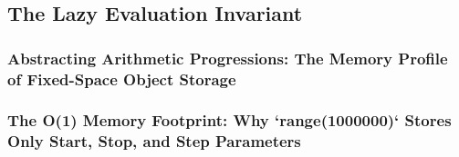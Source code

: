\subsection{The Lazy Evaluation Invariant}
\subsubsection{Abstracting Arithmetic Progressions: The Memory Profile of Fixed-Space Object Storage}
\subsubsection{The O(1) Memory Footprint: Why `range(1000000)` Stores Only Start, Stop, and Step Parameters}
